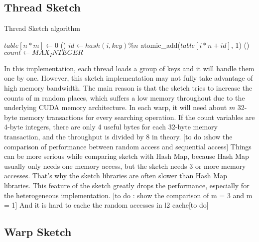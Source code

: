 \documentclass[conference]{IEEEtran}
\begin{document}
\subsection{Thread Sketch}
\begin{algorithm}[H]
    \DontPrintSemicolon
    \caption{Thread Sketch algorithm}
    $table[n * m] \longleftarrow 0$\;
\Fn(){}
{
    {
        {
            $id \leftarrow hash(i, key) \% n$\;
            atomic\_add($table[i * n + id]$, 1)\;
        }
    }
}
\Fn(){}
{
    {
        $count \leftarrow MAX_INTEGER$\;
    }
}

\end{algorithm}

In this implementation, each thread loads a group of keys and it will handle them one by one. However, this sketch implementation may not fully take advantage of high memory bandwidth. The main reason is that the sketch tries to increase the counts of m random places, which suffers a low memory throughout due to the underlying CUDA memory architecture. In each warp, it will need about $m$ 32-byte memory transactions for every searching operation. If the count variables are 4-byte integers, there are only 4 useful bytes for each 32-byte memory transaction, and the throughput is divided by 8 in theory. 
[to do :show the comparison of performance between random access and sequential access]
Things can be more serious while comparing sketch with Hash Map, because Hash Map usually only needs one memory access, but the sketch needs 3 or more memory accesses. That's why the sketch libraries are often slower than Hash Map libraries. This feature of the sketch greatly drops the performance, especially for the heterogeneous implementation. [to do : show the comparison of m = 3 and m = 1]
And it is hard to cache the random accesses in l2 cache[to do]
\subsection{Warp Sketch}
\end{document}
